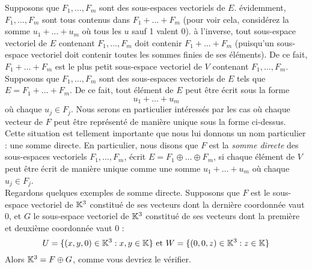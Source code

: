 \documentclass[12pt]{book}
\theoremstyle{plain}
\begin{document}
\indent
{}Supposons que $F_1,\ldots,F_m$ sont des sous-espaces vectoriels de $E$. évidemment, $F_1,\ldots,F_m$ sont tous contenus dans $F_1+\ldots+F_m$ (pour voir cela, considérez la somme $u_1+\ldots+u_m$ où tous les $u$ sauf 1 valent 0). à l'inverse, tout sous-espace vectoriel de $E$ contenant $F_1,\ldots,F_m$ doit contenir $F_1+\ldots+F_m$ (puisqu'un sous-espace vectoriel doit contenir toutes les sommes finies de ses éléments). De ce fait, $F_1+\ldots+F_m$ est le plus petit sous-espace vectoriel de $V$ contenant $F_1,\ldots,F_m$.\\

Supposons que $F_1,\ldots,F_m$ sont des sous-espaces vectoriels de $E$ tels que $E=F_1+\ldots+F_m$. De ce fait, tout élément de $E$ peut être écrit sous la forme
\begin{equation*}
    u_1+\ldots+u_m
\end{equation*}
où chaque $u_j\in F_j$. Nous serons en particulier intéressés par les cas où chaque vecteur de $F$ peut être représenté de manière unique sous la forme ci-dessus. Cette situation est tellement importante que nous lui donnons un nom particulier : une somme directe. En particulier, nous disons que $F$ est la \textit{somme directe} des sous-espaces vectoriels $F_1,\ldots,F_m$, écrit $E=F_1\oplus\ldots\oplus F_m$, si chaque élément de $V$ peut être écrit de manière unique comme une somme $u_1+\ldots+u_m$ où chaque $u_j\in F_j$.\\

Regardons quelques exemples de somme directe. Supposons que $F$ est le sous-espace vectoriel de $\mathbb{K}^3$ constitué de ses vecteurs dont la dernière coordonnée vaut 0, et $G$ le sous-espace vectoriel de $\mathbb{K}^3$ constitué de ses vecteurs dont la première et deuxième coordonnée vaut 0 :
\begin{equation*}
    U=\{(x,y,0)\in\mathbb{K}^3:x,y\in\mathbb{K}\} \textrm{~et~} W=\{(0,0,z)\in\mathbb{K}^3:z\in\mathbb{K}\}
\end{equation*}
Alors $\mathbb{K}^3=F\oplus G$, comme vous devriez le vérifier.\\
\end{document}
